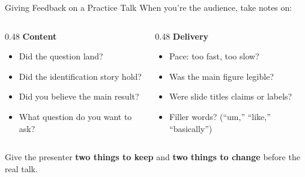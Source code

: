 \begin{frame}{Giving Feedback on a Practice Talk}
  \small
  When you're the audience, take notes on:

  \vspace{4pt}

  \begin{columns}[T]
    \begin{column}{0.48\textwidth}
      \textbf{\textcolor{usfgreen}{Content}}
      \begin{itemize}\setlength\itemsep{0pt}
        \item Did the question land?
        \item Did the identification story hold?
        \item Did you believe the main result?
        \item What question do you want to ask?
      \end{itemize}
    \end{column}
    \begin{column}{0.48\textwidth}
      \textbf{\textcolor{usfgreen}{Delivery}}
      \begin{itemize}\setlength\itemsep{0pt}
        \item Pace: too fast, too slow?
        \item Was the main figure legible?
        \item Were slide titles claims or labels?
        \item Filler words? (``um,'' ``like,'' ``basically'')
      \end{itemize}
    \end{column}
  \end{columns}

  \vspace{6pt}

  Give the presenter \textbf{two things to keep} and \textbf{two things to change} before the real talk.
\end{frame}

